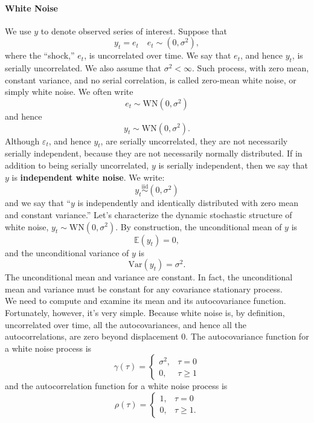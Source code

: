 \documentclass[a4paper, 10pt]{article}
\theoremstyle{definition}	%
\begin{document}
\paragraph{White Noise}
We use $y$ to denote observed series of interest. Suppose that
\begin{equation*}
    y_t = e_t \quad e_t \sim (0, \sigma^2),
\end{equation*}
where the “shock,” $e_t$, is uncorrelated over time. We say that $e_t$, and hence $y_t$, is serially uncorrelated. We also assume that $\sigma^2 < \infty$. Such process, with zero mean, constant variance, and no serial correlation, is called zero-mean white noise, or simply white noise. We often write 
\begin{equation*}
    e_t \sim \mathrm{WN}(0, \sigma^2)
\end{equation*}
and hence
\begin{equation*}
    y_t \sim \mathrm{WN}(0, \sigma^2).
\end{equation*}
Although \( \varepsilon_t \), and hence \( y_t \), are serially uncorrelated, they are not necessarily serially independent, because they are not necessarily normally distributed.
If in addition to being serially uncorrelated, \( y \) is serially independent, then we say that \( y \) is \textbf{independent white noise}. We write:
\[
y_t \overset{\text{iid}}{\sim} (0, \sigma^2)
\]
and we say that “\( y \) is independently and identically distributed with zero mean and constant variance.” 
Let’s characterize the dynamic stochastic structure of white noise, \( y_t \sim \text{WN}(0, \sigma^2) \). By construction, the unconditional mean of \( y \) is
\[
\mathbb{E}(y_t) = 0,
\]
and the unconditional variance of \( y \) is
\[
\text{Var}(y_t) = \sigma^2.
\]
The unconditional mean and variance are constant. In fact, the unconditional mean and variance must be constant for any covariance stationary process.\\
We need to compute and examine its mean and its autocovariance function. Fortunately, however, it’s very simple.
Because white noise is, by definition, uncorrelated over time, all the autocovariances, and hence all the autocorrelations, are zero beyond displacement 0. The autocovariance function for a white noise process is
\[
\gamma(\tau) = 
\begin{cases}
\sigma^2, & \tau = 0 \\
0,        & \tau \geq 1
\end{cases}
\]
and the autocorrelation function for a white noise process is
\[
\rho(\tau) = 
\begin{cases}
1, & \tau = 0 \\
0, & \tau \geq 1.
\end{cases}
\]
\end{document}
